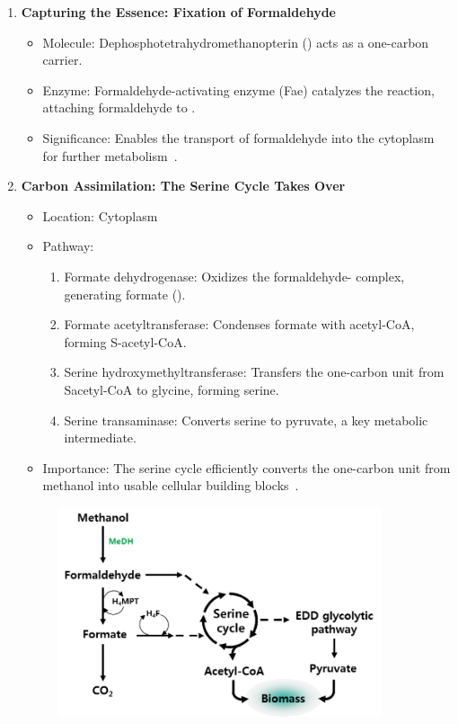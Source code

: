 \begin{enumerate}
\begin{figure}[H]
        \label{fig:mextorquens_metabolism_methanol}
    \end{figure}
    \item \textbf{Capturing the Essence: Fixation of Formaldehyde}
    \begin{itemize}
        \item Molecule: Dephosphotetrahydromethanopterin () acts as a one-carbon
        carrier.
        \item Enzyme: Formaldehyde-activating enzyme (Fae) catalyzes the reaction, attaching
        formaldehyde to \@.
        \item Significance: Enables the transport of formaldehyde into the cytoplasm for
        further metabolism~\cite{methanol_metabolism}.
    \end{itemize}
    \item \textbf{Carbon Assimilation: The Serine Cycle Takes Over}
    \begin{itemize}
        \item Location: Cytoplasm
        \item Pathway:
        \begin{enumerate}
            \item Formate dehydrogenase:
            Oxidizes the formaldehyde- complex, generating formate ().
            \item Formate acetyltransferase:
            Condenses formate with acetyl-CoA, forming S-acetyl-CoA\@.
            \item Serine hydroxymethyltransferase: Transfers the one-carbon unit from Sacetyl-CoA to glycine, forming serine.
            \item Serine transaminase: Converts serine to pyruvate, a key metabolic
            intermediate.
        \end{enumerate}
        \item Importance: The serine cycle efficiently converts the one-carbon unit from
        methanol into usable cellular building blocks~\cite{methanol_metabolism}.
    \end{itemize}
    \begin{figure}[H]
        \centering
        \includegraphics[width=0.9\textwidth]{./media/images/mextorquens_metabolizing_methanol}

\end{figure}
\end{enumerate}
